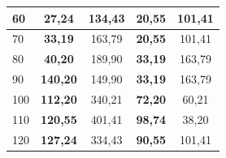 \begin{table}[!hbp]
\begin{tabular}{| p{} |c|c|c|c|}
        \hline
        60 & \textbf{27,24} & 134,43 & \textbf{20,55} & 101,41\\ \hline
        70 & \textbf{ 33,19} & 163,79 &  \textbf{20,55} & 101,41 \\ \hline
        80 & \textbf{40,20} & 189,90 &  \textbf{ 33,19} & 163,79\\ \hline
        90 & \textbf{140,20} & 149,90 &  \textbf{ 33,19} & 163,79\\ \hline
        100 & \textbf{112,20} & 340,21 & \textbf{72,20} & 60,21\\ 
        \hline
        110 & \textbf{120,55} & 401,41 & \textbf{98,74} & 38,20\\ 
        \hline
        120 & \textbf{127,24} & 334,43 & \textbf{90,55} & 101,41\\ \hline
    \end{tabular}
\end{table}

